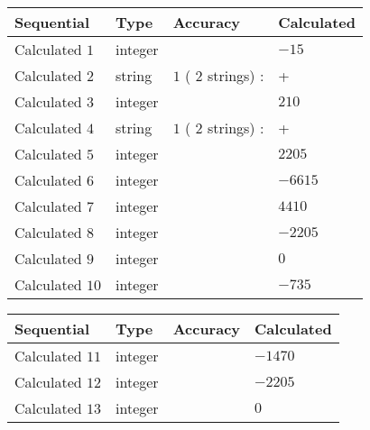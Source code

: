 \documentclass[12pt]{article}
\begin{document}
  
\noindent\begin{tabular}{|l|l|l|l|}
\hline
 Sequential & Type & Accuracy & Calculated \\ 
\hline
 
 
  Calculated $           1$ & integer &  & 
  $ -15 $ 
 \\  \hline  
 
 
  Calculated $           2$ & string & $           1 $ ( $          2 $ strings)
 : 
 & +
 \\  \hline  
 
 
  Calculated $           3$ & integer &  & 
  $ 210 $ 
 \\  \hline  
 
 
  Calculated $           4$ & string & $           1 $ ( $          2 $ strings)
 : 
 & +
 \\  \hline  
 
 
  Calculated $           5$ & integer &  & 
  $ 2205 $ 
 \\  \hline  
 
 
  Calculated $           6$ & integer &  & 
  $ -6615 $ 
 \\  \hline  
 
 
  Calculated $           7$ & integer &  & 
  $ 4410 $ 
 \\  \hline  
 
 
  Calculated $           8$ & integer &  & 
  $ -2205 $ 
 \\  \hline  
 
 
  Calculated $           9$ & integer &  & 
  $ 0 $ 
 \\  \hline  
 
 
  Calculated $          10$ & integer &  & 
  $ -735 $ 
 \\  \hline  
 \end{tabular}
   
   
  
  
\noindent\begin{tabular}{|l|l|l|l|}
\hline
 Sequential & Type & Accuracy & Calculated \\ 
\hline
 
 
  Calculated $          11$ & integer &  & 
  $ -1470 $ 
 \\  \hline  
 
 
  Calculated $          12$ & integer &  & 
  $ -2205 $ 
 \\  \hline  
 
 
  Calculated $          13$ & integer &  & 
  $ 0 $ 
 \\  \hline  
 \end{tabular}
   
\end{document}

